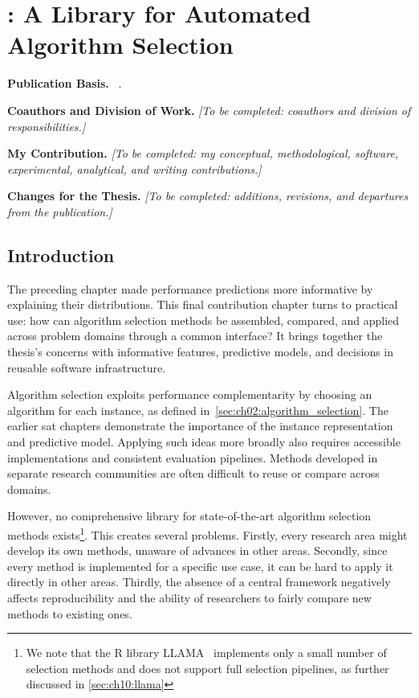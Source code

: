 \chapter{: A Library for Automated Algorithm Selection}
\label{ch:ch10:asf}

\begingroup\small
\noindent\textbf{Publication Basis.} ~\citep{ShaHoo25d}.\par
\noindent\textbf{Coauthors and Division of Work.} \emph{[To be completed: coauthors and division of responsibilities.]}\par
\noindent\textbf{My Contribution.} \emph{[To be completed: my conceptual, methodological, software, experimental, analytical, and writing contributions.]}\par
\noindent\textbf{Changes for the Thesis.} \emph{[To be completed: additions, revisions, and departures from the publication.]}\par
\endgroup\medskip

\section{Introduction}
The preceding chapter made performance predictions more informative by explaining their distributions. This final contribution chapter turns to practical use: how can algorithm selection methods be assembled, compared, and applied across problem domains through a common interface? It brings together the thesis's concerns with informative features, predictive models, and decisions in reusable software infrastructure.

Algorithm selection exploits performance complementarity by choosing an algorithm for each instance, as defined in~\cref{sec:ch02:algorithm_selection}. The earlier \gls{sat} chapters demonstrate the importance of the instance representation and predictive model. Applying such ideas more broadly also requires accessible implementations and consistent evaluation pipelines. Methods developed in separate research communities are often difficult to reuse or compare across domains.

However, no comprehensive library for state-of-the-art algorithm selection methods exists\footnote{We note that the R library LLAMA~\citep{Kotthoff13} implements only a small number of selection methods and does not support full selection pipelines, as further discussed in \cref{sec:ch10:llama}}. This creates several problems.
Firstly, every research area might develop its own methods, unaware of advances in other areas.
Secondly, since every method is implemented for a specific use case, it can be hard to apply it directly in other areas.
Thirdly, the absence of a central framework negatively affects reproducibility and the ability of researchers to fairly compare new methods to existing ones.

